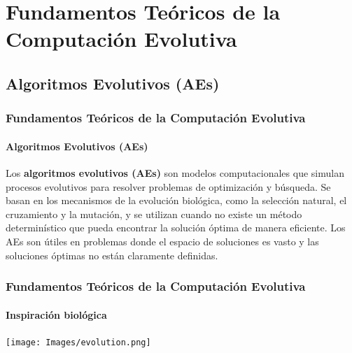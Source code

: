 \documentclass[
	11pt, %
]{beamer}
\begin{document}
\section{Fundamentos Teóricos de la Computación Evolutiva}
\subsection{Algoritmos Evolutivos (AEs)}
\begin{frame}
	\frametitle{Fundamentos Teóricos de la Computación Evolutiva}
	\framesubtitle{Algoritmos Evolutivos (AEs)}
        Los \textbf{algoritmos evolutivos (AEs)} son modelos computacionales que simulan procesos evolutivos para resolver problemas de optimización y búsqueda. Se basan en los mecanismos de la evolución biológica, como la selección natural, el cruzamiento y la mutación, y se utilizan cuando no existe un método determinístico que pueda encontrar la solución óptima de manera eficiente. Los AEs son útiles en problemas donde el espacio de soluciones es vasto y las soluciones óptimas no están claramente definidas.
\end{frame}

\begin{frame}
	\frametitle{Fundamentos Teóricos de la Computación Evolutiva}
	\framesubtitle{Inspiración biológica}
        \begin{center}
            \texttt{[image: Images/evolution.png]}
        \end{center}
\end{frame}

\end{document}
